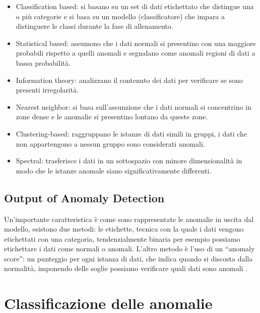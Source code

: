 \begin{itemize}
    \item Classification based: si basano su un set di dati etichettato che distingue una o più categorie e si basa su un modello (classificatore) che impara a distinguere le classi durante la fase di allenamento.
    \item Statistical based: assumono che i dati normali si presentino con una maggiore probabili rispetto a quelli anomali e segnalano come anomali regioni di dati a bassa probabilità.
    \item Information theory: analizzano il contenuto dei dati per verificare se sono presenti irregolarità.
    \item Nearest neighbor: si basa sull'assunzione che i dati normali si concentrino in zone dense e le anomalie si presentino lontano da queste zone.
    \item Clustering-based: raggruppano le istanze di dati simili in gruppi, i dati che non appartengono a nessun gruppo sono considerati anomali.
    \item Spectral: trasferisce i dati in un sottospazio con minore dimensionalità in modo che le istanze anomale siano significativamente differenti.
\end{itemize}



\subsection{Output of Anomaly Detection}

Un'importante caratteristica è come sono rappresentate le anomalie in uscita dal modello, esistono due metodi: le etichette, tecnica con la quale i dati vengono etichettati con una categoria, tendenzialmente binaria per esempio possiamo etichettare i dati come normali o anomali. L'altro metodo è l'uso di un ``anomaly score'': un punteggio per ogni istanza di dati, che indica quando si discosta dalla normalità, imponendo delle soglie possiamo verificare quali dati sono anomali \cite{anomaly_detection_survey_2_deep_learning,anomaly_detection_survey_3,anomaly_detection_survey_1_network}.


\section{Classificazione delle anomalie}

